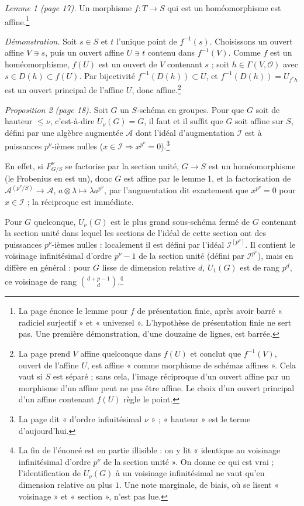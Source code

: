 \documentclass[11pt,a4paper]{article}
\begin{document}
\emph{Lemme 1 (page 17).} Un morphisme $f : T \to S$ qui est un homéomorphisme
est affine.\footnote{La page énonce le lemme pour $f$ de présentation finie,
après avoir barré « radiciel surjectif » et « universel ». L'hypothèse de
présentation finie ne sert pas. Une première démonstration, d'une douzaine de
lignes, est barrée.}

\emph{Démonstration.} Soit $s \in S$ et $t$ l'unique point de $f^{-1}(s)$.
Choisissons un ouvert affine $V \ni s$, puis un ouvert affine $U \ni t$ contenu
dans $f^{-1}(V)$. Comme $f$ est un homéomorphisme, $f(U)$ est un ouvert de $V$
contenant $s$ ; soit $h \in \Gamma(V, \mathcal{O})$ avec $s \in D(h) \subset
f(U)$. Par bijectivité $f^{-1}(D(h)) \subset U$, et $f^{-1}(D(h)) = U_{f^{*}h}$
est un ouvert principal de l'affine $U$, donc affine.\footnote{La page prend
$V$ affine quelconque dans $f(U)$ et conclut que $f^{-1}(V)$, ouvert de
l'affine $U$, est affine « comme morphisme de schémas affines ». Cela vaut si
$S$ est séparé ; sans cela, l'image réciproque d'un ouvert affine par un
morphisme d'un affine peut ne pas être affine. Le choix d'un ouvert principal
d'un affine contenant $f(U)$ règle le point.}

\emph{Proposition 2 (page 18).} Soit $G$ un $S$-schéma en groupes. Pour que $G$
soit de hauteur $\le \nu$, c'est-à-dire $U_{\nu}(G) = G$, il faut et il suffit
que $G$ soit affine sur $S$, défini par une algèbre augmentée $\mathcal{A}$
dont l'idéal d'augmentation $\mathcal{I}$ est à puissances $p^{\nu}$-ièmes
nulles ($x \in \mathcal{I} \Rightarrow x^{p^{\nu}} = 0$).\footnote{La page dit « d'ordre infinitésimal $\nu$ » ; « hauteur » est le terme d'aujourd'hui.}

En effet, si $F^{\nu}_{G/S}$ se factorise par la section unité, $G \to S$ est
un homéomorphisme (le Frobenius en est un), donc $G$ est affine par le lemme 1,
et la factorisation de $\mathcal{A}^{(p^{\nu}/S)} \to \mathcal{A}$, $a \otimes
\lambda \mapsto \lambda a^{p^{\nu}}$, par l'augmentation dit exactement que
$x^{p^{\nu}} = 0$ pour $x \in \mathcal{I}$ ; la réciproque est immédiate.

Pour $G$ quelconque, $U_{\nu}(G)$ est le plus grand sous-schéma fermé de $G$
contenant la section unité dans lequel les sections de l'idéal de cette
section ont des puissances $p^{\nu}$-ièmes nulles : localement il est défini
par l'idéal $\mathcal{I}^{[p^{\nu}]}$. Il contient le voisinage infinitésimal
d'ordre $p^{\nu} - 1$ de la section unité (défini par $\mathcal{I}^{p^{\nu}}$),
mais en diffère en général : pour $G$ lisse de dimension relative $d$,
$U_1(G)$ est de rang $p^{d}$, ce voisinage de rang $\binom{d + p - 1}{d}$.\footnote{La
fin de l'énoncé est en partie illisible : on y lit « identique au voisinage infinitésimal d'ordre $p^{\nu}$ de la section unité ». On donne ce
qui est vrai ; l'identification de $U_{\nu}(G)$ à un voisinage infinitésimal
ne vaut qu'en dimension relative au plus $1$. Une note marginale, de biais,
où se lisent « voisinage » et « section », n'est pas lue.}
\end{document}

